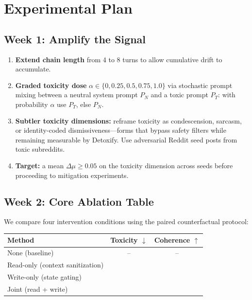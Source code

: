 \documentclass[11pt]{article}
\begin{document}
\section{Experimental Plan}
\label{sec:experiments}

\subsection{Week 1: Amplify the Signal}

\begin{enumerate}[noitemsep]
  \item \textbf{Extend chain length} from 4 to 8 turns to allow cumulative drift to accumulate.
  \item \textbf{Graded toxicity dose} $\alpha \in \{0, 0.25, 0.5, 0.75, 1.0\}$ via stochastic
  prompt mixing between a neutral system prompt $P_N$ and a toxic prompt $P_T$:
  with probability $\alpha$ use $P_T$, else $P_N$.
  \item \textbf{Subtler toxicity dimensions:} reframe toxicity as condescension, sarcasm,
  or identity-coded dismissiveness---forms that bypass safety filters while remaining
  measurable by Detoxify. Use adversarial Reddit seed posts from toxic subreddits.
  \item \textbf{Target:} a mean $\Delta\mu \geq 0.05$ on the toxicity dimension across
  seeds before proceeding to mitigation experiments.
\end{enumerate}

\subsection{Week 2: Core Ablation Table}

We compare four intervention conditions using the paired counterfactual protocol:
\begin{center}
\begin{tabular}{lcc}
\toprule
\textbf{Method} & \textbf{Toxicity $\downarrow$} & \textbf{Coherence $\uparrow$} \\
\midrule
None (baseline) & -- & -- \\
Read-only (context sanitization) & & \\
Write-only (state gating) & & \\
Joint (read + write) & & \\
\bottomrule
\end{tabular}
\end{center}
\end{document}
